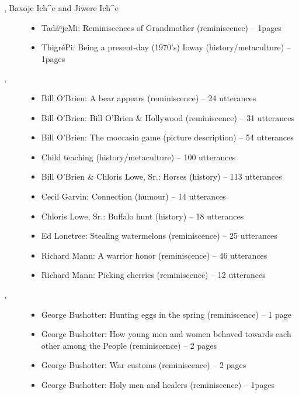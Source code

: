\documentclass[output=paper]{LSP/langsci}
\begin{document}
\begin{description}
\item[\citet{GoodTracks2004b}, Baxoje Ich\^{}e and Jiwere Ich\^{}e]\hfill
\begin{itemize}
\item TadáⁿjeMi: Reminiscences of Grandmother (reminiscence) -- 1\textonehalf{}pages
\item ThigréPi: Being a present-day (1970’s) Ioway (history/metaculture) -- 1\textonehalf{}pages
\end{itemize}

\item[\citet{HartmannMarschke2010}, ]\hfill
\begin{itemize}
\item Bill O’Brien: A bear appears (reminiscence) -- 24 utterances
\item Bill O’Brien: Bill O’Brien \& Hollywood (reminiscence) -- 31 utterances
\item Bill O’Brien: The moccasin game (picture description) -- 54 utterances
\item Child teaching (history/metaculture) -- 100 utterances
\item Bill O’Brien \& Chloris Lowe, Sr.: Horses (history) -- 113 utterances
\item Cecil Garvin: Connection (humour) -- 14 utterances
\item Chloris Lowe, Sr.: Buffalo hunt (history) -- 18 utterances
\item Ed Lonetree: Stealing watermelons (reminiscence) -- 25 utterances
\item Richard Mann: A warrior honor (reminiscence) -- 46 utterances
\item Richard Mann: Picking cherries (reminiscence) -- 12 utterances
\end{itemize}

\item[\citet{Ingham2003}, ]\hfill
\begin{itemize}
\item George Bushotter: Hunting eggs in the spring (reminiscence) -- 1 page
\item George Bushotter: How young men and women behaved towards each other among the People (reminiscence) -- 2 pages
\item George Bushotter: War customs (reminiscence) -- 2 pages
\item George Bushotter: Holy men and healers (reminiscence) -- 1\textonehalf{}pages
\end{itemize}


\end{description}
\end{document}
